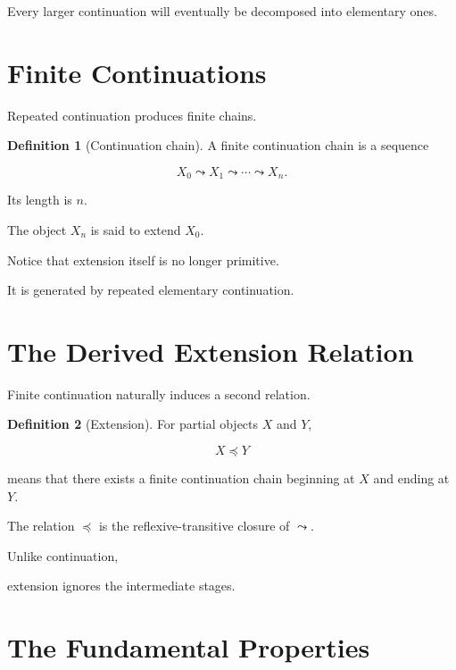 \documentclass[13pt,openany]{book}
\theoremstyle{plain}
\theoremstyle{definition}
\newtheorem{definition}{Definition}[chapter]
\begin{document}
Every larger continuation will eventually be decomposed into elementary
ones.

\section{Finite Continuations}

Repeated continuation produces finite chains.

\begin{definition}[Continuation chain]
A finite continuation chain is a sequence

\[
X_0
\leadsto
X_1
\leadsto
\cdots
\leadsto
X_n.
\]

Its length is \(n\).
\end{definition}

The object \(X_n\) is said to extend \(X_0\).

Notice that extension itself is no longer primitive.

It is generated by repeated elementary continuation.

\section{The Derived Extension Relation}

Finite continuation naturally induces a second relation.

\begin{definition}[Extension]
For partial objects \(X\) and \(Y\),

\[
X\preceq Y
\]

means that there exists a finite continuation chain beginning at \(X\) and
ending at \(Y\).
\end{definition}

The relation \(\preceq\) is the reflexive-transitive closure of
\(\leadsto\).

Unlike continuation,

extension ignores the intermediate stages.

\section{The Fundamental Properties}
\end{document}
